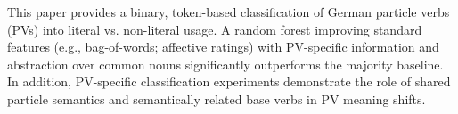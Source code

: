 This paper provides a binary, token-based classification of German particle verbs (PVs) into literal vs. non-literal usage. A random forest improving standard features (e.g., bag-of-words; affective ratings) with PV-specific information and abstraction over common nouns significantly outperforms the majority baseline. In addition, PV-specific classification experiments demonstrate the role of shared particle semantics and semantically related base verbs in PV meaning shifts.
